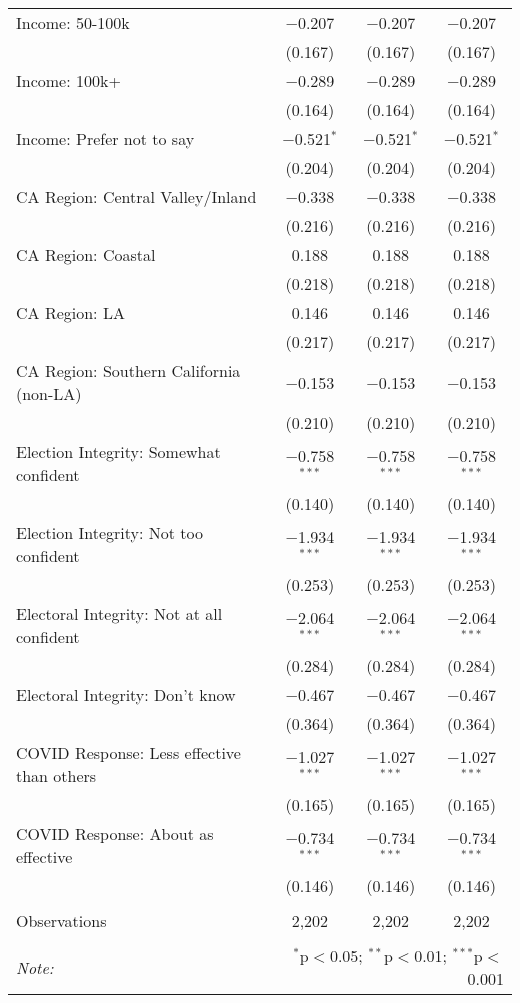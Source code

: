 \begin{table}[!htbp]
\begin{tabular}{@{\extracolsep{5pt}}lccc}
  Income: 50-100k & $-$0.207 & $-$0.207 & $-$0.207 \\ 
  & (0.167) & (0.167) & (0.167) \\ 
  Income: 100k+ & $-$0.289 & $-$0.289 & $-$0.289 \\ 
  & (0.164) & (0.164) & (0.164) \\ 
  Income: Prefer not to say & $-$0.521$^{*}$ & $-$0.521$^{*}$ & $-$0.521$^{*}$ \\ 
  & (0.204) & (0.204) & (0.204) \\ 
  CA Region: Central Valley/Inland & $-$0.338 & $-$0.338 & $-$0.338 \\ 
  & (0.216) & (0.216) & (0.216) \\ 
  CA Region: Coastal & 0.188 & 0.188 & 0.188 \\ 
  & (0.218) & (0.218) & (0.218) \\ 
  CA Region: LA & 0.146 & 0.146 & 0.146 \\ 
  & (0.217) & (0.217) & (0.217) \\ 
  CA Region: Southern California (non-LA) & $-$0.153 & $-$0.153 & $-$0.153 \\ 
  & (0.210) & (0.210) & (0.210) \\ 
  Election Integrity: Somewhat confident & $-$0.758$^{***}$ & $-$0.758$^{***}$ & $-$0.758$^{***}$ \\ 
  & (0.140) & (0.140) & (0.140) \\ 
  Election Integrity: Not too confident & $-$1.934$^{***}$ & $-$1.934$^{***}$ & $-$1.934$^{***}$ \\ 
  & (0.253) & (0.253) & (0.253) \\ 
  Electoral Integrity: Not at all confident & $-$2.064$^{***}$ & $-$2.064$^{***}$ & $-$2.064$^{***}$ \\ 
  & (0.284) & (0.284) & (0.284) \\ 
  Electoral Integrity: Don't know & $-$0.467 & $-$0.467 & $-$0.467 \\ 
  & (0.364) & (0.364) & (0.364) \\ 
  COVID Response: Less effective than others & $-$1.027$^{***}$ & $-$1.027$^{***}$ & $-$1.027$^{***}$ \\ 
  & (0.165) & (0.165) & (0.165) \\ 
  COVID Response: About as effective & $-$0.734$^{***}$ & $-$0.734$^{***}$ & $-$0.734$^{***}$ \\ 
  & (0.146) & (0.146) & (0.146) \\ 
 \hline \\[-1.8ex] 
Observations & 2,202 & 2,202 & 2,202 \\ 
\hline 
\hline \\[-1.8ex] 
\textit{Note:}  & \multicolumn{3}{r}{$^{*}$p$<$0.05; $^{**}$p$<$0.01; $^{***}$p$<$0.001} \\ 
\end{tabular} 
\end{table} 
